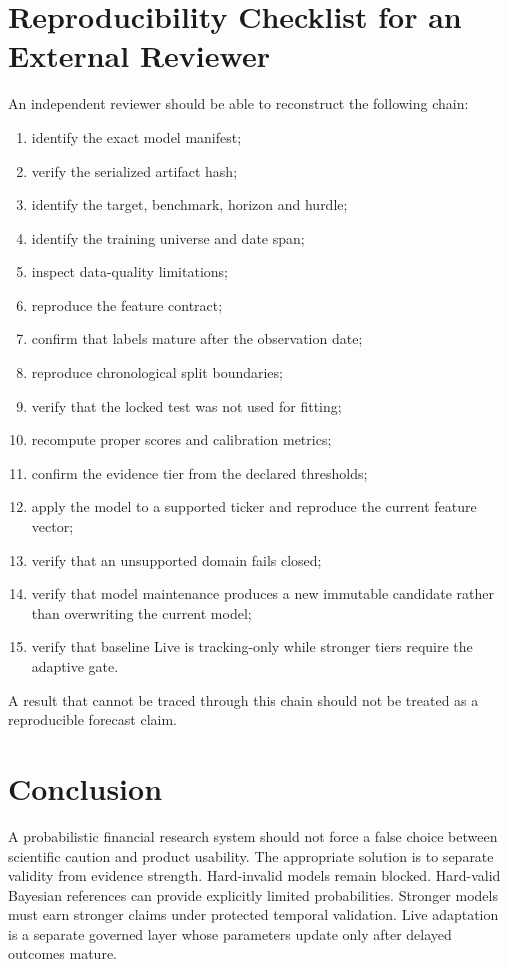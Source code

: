 \documentclass[11pt]{article}
\begin{document}
\section{Reproducibility Checklist for an External Reviewer}
An independent reviewer should be able to reconstruct the following chain:
\begin{enumerate}[itemsep=0.2em]
\item identify the exact model manifest;
\item verify the serialized artifact hash;
\item identify the target, benchmark, horizon and hurdle;
\item identify the training universe and date span;
\item inspect data-quality limitations;
\item reproduce the feature contract;
\item confirm that labels mature after the observation date;
\item reproduce chronological split boundaries;
\item verify that the locked test was not used for fitting;
\item recompute proper scores and calibration metrics;
\item confirm the evidence tier from the declared thresholds;
\item apply the model to a supported ticker and reproduce the current feature vector;
\item verify that an unsupported domain fails closed;
\item verify that model maintenance produces a new immutable candidate rather than overwriting the current model;
\item verify that baseline Live is tracking-only while stronger tiers require the adaptive gate.
\end{enumerate}

A result that cannot be traced through this chain should not be treated as a reproducible forecast claim.

\section{Conclusion}
A probabilistic financial research system should not force a false choice between scientific caution and product usability. The appropriate solution is to separate validity from evidence strength. Hard-invalid models remain blocked. Hard-valid Bayesian references can provide explicitly limited probabilities. Stronger models must earn stronger claims under protected temporal validation. Live adaptation is a separate governed layer whose parameters update only after delayed outcomes mature.
\end{document}
